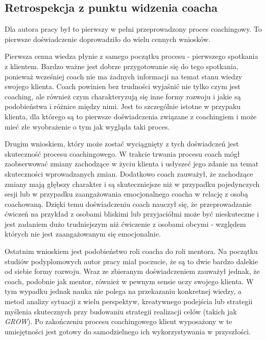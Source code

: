 \subsection{Retrospekcja z punktu widzenia coacha}

Dla autora pracy był to pierwszy w pełni przeprowadzony proces coachingowy. To pierwsze doświadczenie doprowadziło do wielu cennych wniosków.

Pierwsza cenna wiedza płynie z samego początku procesu - pierwszego spotkania z klientem. Bardzo ważne jest dobrze przygotowanie się do tego spotkania,
ponieważ wcześniej coach nie ma żadnych informacji na temat stanu wiedzy swojego klienta. Coach powinien bez trudności wyjaśnić nie tylko czym jest coaching,
ale również czym charakteryzują się inne formy rozwoju i jakie są podobieństwa i różnice między nimi. Jest to szczególnie istotne w przypaku
klienta, dla którego są to pierwsze doświadczenia związane z coachingiem i może mieć złe wyobrażenie o tym jak wygląda taki proces.

Drugim wnioskiem, który może zostać wyciągnięty z tych doświadczeń jest skuteczność procesu coachingowego. W trakcie trwania procesu coach mógł zaobserwować
zmiany zachodzące w życiu klienta i usłyszeć jego zdanie na temat skuteczności wprowadzanych zmian. Dodatkowo coach zauważył, że zachodzące zmiany
mają głębszy charakter i są skuteczniejsze niż w przypadku pojedynczych sesji lub w przypadku zaangażowania emocjonalnego coacha w relację z osobą
coachowaną. Dzięki temu doświadczeniu coach nauczył się, że przeprowadzanie ćwiczeń na przykład z osobami bliskimi lub przyjaciółmi może być nieskuteczne
i jest zadaniem dużo trudniejszym niż ćwiczenie z osobami obcymi - względem których nie jest zaangażowanym się emocjonalnie.

Ostatnim wnioskiem jest podobieństwo roli coacha do roli mentora. Na początku studiów podyplomowych autor pracy miał poczucie, że są to dwie bardzo
dalekie od siebie formy rozwoju. Wraz ze zbieranym doświadczeniem zauważył jednak, że coach, podobnie jak mentor, również w pewnym sensie uczy swojego klienta.
W tym wypadku jednak nauka nie polega na przekazaniu konkretnej wiedzy, a metod analizy sytuacji z wielu perspektyw, kreatywnego podejścia lub
strategii myślenia skutecznych przy budowaniu strategii realizacji celów (takich jak \emph{GROW}). Po zakończeniu procesu coachingowego klient wyposażony
w te umiejętności jest gotowy do samodzielnego ich wykorzystywania w przyszłości.
